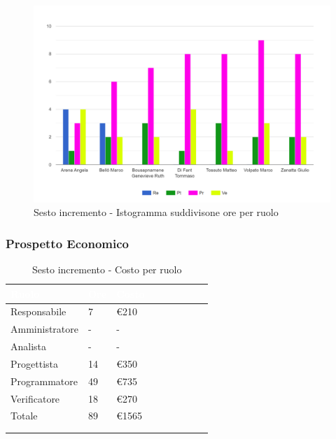 {{      \begin{figure}[H]
        \includegraphics[width=15cm]{sezioni/images/sesto.png}
        \centering
        \caption{Sesto incremento - Istogramma suddivisone ore per ruolo}
     \end{figure}
    }

    \subsubsection{Prospetto Economico}
    {
        \setlength{\freewidth}{\dimexpr\textwidth-30\tabcolsep}
        \renewcommand{\arraystretch}{1.0}
        \setlength{\aboverulesep}{0pt}
        \setlength{\belowrulesep}{0pt}
        \begin{longtable}{C{.4\freewidth} C{.2\freewidth} C{.2\freewidth} C{.2\freewidth} C{.2\freewidth} C{.2\freewidth} C{.2\freewidth} C{.2\freewidth} C{.2\freewidth}}
          \toprule
        \textcolor{white}{\textbf{Ruolo}}&
        \textcolor{white}{\textbf{Ore}}&
        \textcolor{white}{\textbf{Costo}}\\
        \toprule
        \endhead
            
        Responsabile  & 7 & \euro210\\
        Amministratore  & - & - \\
        Analista &- & -\\
        Progettista &14 &\euro350\\
        Programmatore &49 & \euro735\\
        Verificatore &18 &\euro270\\
        Totale&89&\euro1565\\
        \bottomrule
      \\
        \caption{Sesto incremento - Costo per ruolo}


\end{longtable}}}
